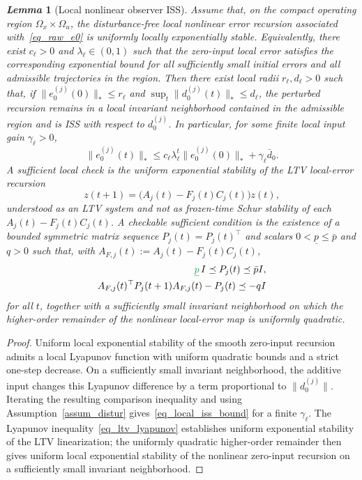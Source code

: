 \documentclass[letterpaper,journal]{IEEEtran}
\newtheorem{lemma}{\it Lemma}%
\newcommand{\azrevcolor}{ForestGreen}
\newcommand{\azrev}[1]{\textcolor{\azrevcolor}{#1}}
\begin{document}
\begin{lemma}[Local nonlinear observer ISS]\label{lem_local_iss}
Assume that, on the compact operating region $\Omega_x\times\Omega_u$, the disturbance-free local nonlinear error recursion associated with~\eqref{eq_raw_e0} is uniformly locally exponentially stable. Equivalently, there exist $c_{\ell}>0$ and $\lambda_{\ell}\in(0,1)$ such that the zero-input local error satisfies the corresponding exponential bound for all sufficiently small initial errors and all admissible trajectories in the region. Then there exist local radii $r_{\ell},d_{\ell}>0$ such that, if $\|e_0^{(j)}(0)\|_*\le r_{\ell}$ and $\sup_t\|d_0^{(j)}(t)\|_*\le d_{\ell}$, the perturbed recursion remains in a local invariant neighborhood contained in the admissible region and is ISS with respect to $d_0^{(j)}$. In particular, for some finite local input gain $\gamma_{\ell}>0$,
\begin{equation}
\|e_0^{(j)}(t)\|_*
\le c_{\ell}\lambda_{\ell}^{t}\|e_0^{(j)}(0)\|_*
+\gamma_{\ell}\bar d_0 .
\label{eq_local_iss_bound}
\end{equation}
A sufficient local check is the uniform exponential stability of the LTV local-error recursion
\begin{equation}
z(t+1)=\big(A_j(t)-F_j(t)C_j(t)\big)z(t),
\label{eq_ltv_local_error}
\end{equation}
understood as an LTV system and not as frozen-time Schur stability of each $A_j(t)-F_j(t)C_j(t)$. A checkable sufficient condition is the existence of a bounded symmetric matrix sequence $P_j(t)=P_j(t)^\top$ and scalars $0<\underline p\le\bar p$ and $q>0$ such that, with $A_{F,j}(t):=A_j(t)-F_j(t)C_j(t)$,
\begin{align}
\azrev{\underline p}\, I \preceq P_j(t)\preceq\bar p I,\notag\\
A_{F,j}(t)^\top P_j(t+1)A_{F,j}(t)-P_j(t)
\preceq-qI
\label{eq_ltv_lyapunov}
\end{align}
for all $t$, together with a sufficiently small invariant neighborhood on which the higher-order remainder of the nonlinear local-error map is uniformly quadratic.
\end{lemma}
\begin{proof}
Uniform local exponential stability of the smooth zero-input recursion admits a local Lyapunov function with uniform quadratic bounds and a strict one-step decrease. On a sufficiently small invariant neighborhood, the additive input changes this Lyapunov difference by a term proportional to $\|d_0^{(j)}\|$. Iterating the resulting comparison inequality and using Assumption~\ref{assum_distur} gives~\eqref{eq_local_iss_bound} for a finite $\gamma_{\ell}$. The Lyapunov inequality~\eqref{eq_ltv_lyapunov} establishes uniform exponential stability of the LTV linearization; the uniformly quadratic higher-order remainder then gives uniform local exponential stability of the nonlinear zero-input recursion on a sufficiently small invariant neighborhood.
\end{proof}
\end{document}
